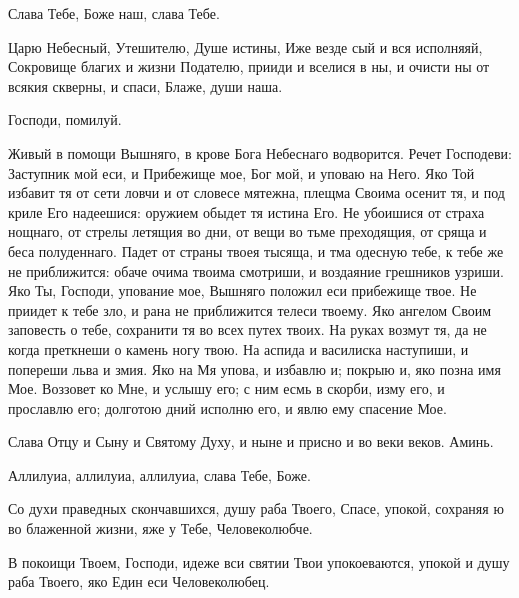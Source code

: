 \begin{mymulticols}
 

\MolitvamiSviatyhOtecNashih 

Слава Тебе, Боже наш, слава Тебе. 

Царю Небесный, Утешителю, Душе истины, Иже везде сый и вся исполняяй, Сокровище благих и жизни Подателю, прииди и вселися в ны, и очисти ны от всякия скверны, и спаси, Блаже, души наша. 

\TrisviatoePoOtcheNash

Господи, помилуй. 

\slavainynen

\priiditepoklonimsia


Живый в помощи Вышняго, в крове Бога Небеснаго водворится. Речет Господеви: Заступник мой еси, и Прибежище мое, Бог мой, и уповаю на Него. Яко Той избавит тя от сети ловчи и от словесе мятежна, плещма Своима осенит тя, и под криле Его надеешися: оружием обыдет тя истина Его. Не убоишися от страха нощнаго, от стрелы летящия во дни, от вещи во тьме преходящия, от сряща и беса полуденнаго. Падет от страны твоея тысяща, и тма одесную тебе, к тебе же не приближится: обаче очима твоима смотриши, и воздаяние грешников узриши. Яко Ты, Господи, упование мое, Вышняго положил еси прибежище твое. Не приидет к тебе зло, и рана не приближится телеси твоему. Яко ангелом Своим заповесть о тебе, сохранити тя во всех путех твоих. На руках возмут тя, да не когда преткнеши о камень ногу твою. На аспида и василиска наступиши, и попереши льва и змия. Яко на Мя упова, и избавлю и; покрыю и, яко позна имя Мое. Воззовет ко Мне, и услышу его; с ним есмь в скорби, изму его, и прославлю его; долготою дний исполню его, и явлю ему спасение Мое. 

Слава Отцу и Сыну и Святому Духу, и ныне и присно и во веки веков. Аминь. 

Аллилуиа, аллилуиа, аллилуиа, слава Тебе, Боже. 


Со духи праведных скончавшихся, душу раба Твоего, Спасе, упокой, сохраняя ю во блаженной жизни, яже у Тебе, Человеколюбче. 

В покоищи Твоем, Господи, идеже вси святии Твои упокоеваются, упокой и душу раба Твоего, яко Един еси Человеколюбец. 

\slavan


\end{mymulticols}
